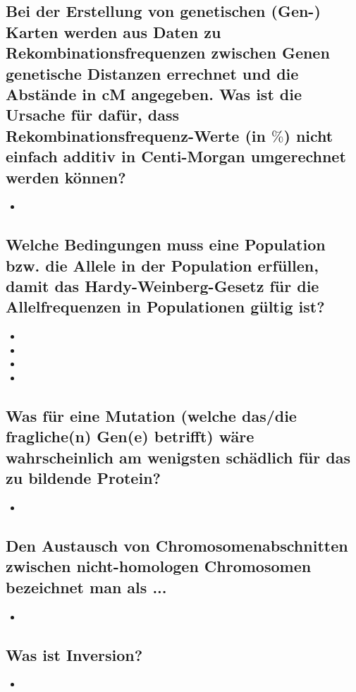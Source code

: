 \documentclass{article}
\begin{document}
\subsection*{Bei der Erstellung von genetischen (Gen-) Karten werden aus Daten zu
Rekombinationsfrequenzen zwischen Genen genetische Distanzen
errechnet und die Abstände in cM angegeben. Was ist die Ursache für
dafür, dass Rekombinationsfrequenz-Werte (in $\%$) nicht einfach additiv in
Centi-Morgan umgerechnet werden können?}
\begin{itemize}
    \item \bigskip
\end{itemize}

\subsection*{Welche Bedingungen muss eine Population bzw. die Allele in der
Population erfüllen, damit das Hardy-Weinberg-Gesetz für die
Allelfrequenzen in Populationen gültig ist?}
\begin{itemize}
    \item 
    \item 
    \item 
    \item 
\end{itemize}

\subsection*{Was für eine Mutation (welche das/die fragliche(n) Gen(e) betrifft) wäre
wahrscheinlich am wenigsten schädlich für das zu bildende Protein?}
\begin{itemize}
    \item 
\end{itemize}

\subsection*{Den Austausch von Chromosomenabschnitten zwischen nicht-homologen
Chromosomen bezeichnet man als ...}
\begin{itemize}
    \item 
\end{itemize}

\subsection*{Was ist Inversion?}
\begin{itemize}
    \item 
\end{itemize}
\end{document}
